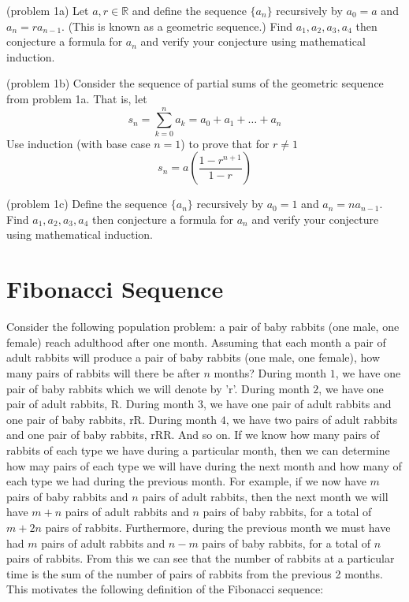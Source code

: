 \documentclass[handout]{ximera}
\begin{document}
\begin{problem}(problem 1a)
Let $a, r \in \mathbb{R}$ and define the sequence $\{a_n\}$ recursively by $a_0 = a$ and $a_n = ra_{n-1} $.  (This is known as a geometric sequence.)
Find $a_1, a_2, a_3, a_4$ then conjecture a formula for $a_n$ and verify your conjecture using mathematical induction.\\
\end{problem}

\begin{problem}(problem 1b)
Consider the sequence of partial sums of the geometric sequence from problem 1a. That is, let
\[
s_n = \sum_{k=0}^n a_k = a_0 + a_1 + \dots + a_n
\]
Use induction (with base case $n=1$) to prove that for $r \neq 1$
\[
s_n = a\left(\frac{1-r^{n+1}}{1-r}\right)
\]
\end{problem}

\begin{problem}(problem 1c)
Define the sequence $\{a_n\}$ recursively by $a_0 = 1$ and $a_n = na_{n-1} $.  
Find $a_1, a_2, a_3, a_4$ then conjecture a formula for $a_n$ and verify your conjecture using mathematical induction.\\
\end{problem}

\section{Fibonacci Sequence}
Consider the following population problem: a pair of baby rabbits (one male, one female) reach adulthood after one month. 
Assuming that each month a pair of adult rabbits will produce a pair of baby rabbits (one male, one female), 
how many pairs of rabbits will there be after $n$ months? During month $1$, we have one pair of baby rabbits which we will denote by 'r'.
During month $2$, we have one pair of adult rabbits, R. During month $3$, we have one pair of adult rabbits and one pair of baby rabbits, rR.
During month $4$, we have two pairs of adult rabbits and one pair of baby rabbits, rRR. And so on. 
If we know how many pairs of rabbits of each type we have during a particular month, 
then we can determine how may pairs of each type we will have during the next month and how many of each type we had during the previous month.
For example, if we now have $m$ pairs of baby rabbits and $n$ pairs of adult rabbits, 
then the next month we will have $m+n$ pairs of adult rabbits and $n$ pairs of baby rabbits, 
for a total of $m+2n$ pairs of rabbits.  
Furthermore, during the previous month we must have had $m$ pairs of adult rabbits and $n-m$ pairs of baby rabbits, 
for a total of $n$ pairs of rabbits.
From this we can see that the number of rabbits at a particular time is the sum of the number of pairs of rabbits from the previous 2 months.
This motivates the following definition of the Fibonacci sequence:
\end{document}
